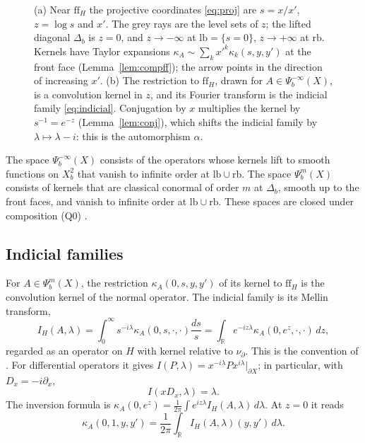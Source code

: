 \documentclass[11pt,oneside,reqno]{article}
\theoremstyle{plain}
\theoremstyle{definition}
\theoremstyle{remark}
\begin{document}
\begin{figure}[tbp]
\caption[The b-double space near a front face]{(a) Near
\(\mathrm{ff}_H\) the projective coordinates \eqref{eq:proj} are
\(s=x/x'\), \(z=\log s\) and \(x'\). The grey rays are the level sets of
\(z\); the lifted diagonal \(\Delta_b\) is \(z=0\), and \(z\to-\infty\) at
\(\mathrm{lb}=\{s=0\}\), \(z\to+\infty\) at \(\mathrm{rb}\). Kernels have
Taylor expansions \(\kappa_A\sim\sum_kx'^k\kappa_k(s,y,y')\) at the
front face (Lemma~\ref{lem:compff}); the arrow points in the direction of
increasing \(x'\). (b) The restriction to
\(\mathrm{ff}_H\), drawn for \(A\in\Psi_b^{-\infty}(X)\), is a convolution
kernel in \(z\), and its Fourier transform is the indicial family
\eqref{eq:indicial}. Conjugation by \(x\) multiplies the kernel by
\(s^{-1}=e^{-z}\) (Lemma~\ref{lem:conj}), which shifts the indicial family
by \(\lambda\mapsto\lambda-i\): this is the automorphism \(\alpha\).}
\label{fig:bdouble}
\end{figure}

The space \(\Psi_b^{-\infty}(X)\) consists of the operators whose kernels
lift to smooth functions on \(X_b^2\) that vanish to infinite order at
\(\mathrm{lb}\cup\mathrm{rb}\). The space \(\Psi_b^m(X)\) consists of
kernels that are classical conormal of order \(m\) at \(\Delta_b\), smooth up
to the front faces, and vanish to infinite order at \(\mathrm{lb}\cup
\mathrm{rb}\). These spaces are closed under composition (Q0)
\cite[Thm.~``Small b-composition'']{Notes}.

\subsection{Indicial families}
For \(A\in\Psi_b^m(X)\), the restriction \(\kappa_A(0,s,y,y')\) of its
kernel to \(\mathrm{ff}_H\) is the convolution kernel of the normal
operator. The indicial family is its Mellin transform,
\begin{equation}\label{eq:indicial}
 I_H(A,\lambda)=\int_0^\infty s^{-i\lambda}\kappa_A(0,s,\cdot,\cdot)
 \frac{ds}{s}
 =\int_{\mathbb R}e^{-iz\lambda}\kappa_A(0,e^z,\cdot,\cdot)\,dz,
\end{equation}
regarded as an operator on \(H\) with kernel relative to \(\nu_\partial\).
This is the convention of \cite[Sect.~``The normal operator'']{Notes}. For
differential operators it gives \(I(P,\lambda)=x^{-i\lambda}Px^{i\lambda}
|_{\partial X}\); in particular, with \(D_x=-i\partial_x\),
\begin{equation}\label{eq:IxDx}
 I(xD_x,\lambda)=\lambda .
\end{equation}
The inversion formula is
\(\kappa_A(0,e^z)=\frac1{2\pi}\int e^{iz\lambda}I_H(A,\lambda)\,d\lambda\).
At \(z=0\) it reads
\begin{equation}\label{eq:diagvalue}
 \kappa_A(0,1,y,y')=\frac1{2\pi}\int_{\mathbb R}I_H(A,\lambda)(y,y')\,
 d\lambda .
\end{equation}
\end{document}
